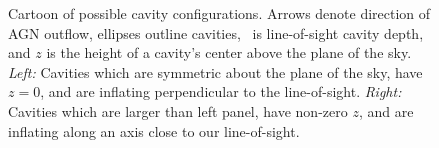 \begin{figure}
  \begin{center}
    \begin{minipage}{\linewidth}
      \setlength\fboxsep{0pt}
      \setlength\fboxrule{0.5pt}
    \end{minipage}
    \caption{Cartoon of possible cavity configurations. Arrows denote
      direction of AGN outflow, ellipses outline cavities, \rlos\ is
      line-of-sight cavity depth, and $z$ is the height of a cavity's
      center above the plane of the sky. {\it{Left:}} Cavities which
      are symmetric about the plane of the sky, have $z=0$, and are
      inflating perpendicular to the line-of-sight. {\it{Right:}}
      Cavities which are larger than left panel, have non-zero $z$,
      and are inflating along an axis close to our line-of-sight.}
    \label{fig:config}
  \end{center}
\end{figure}

